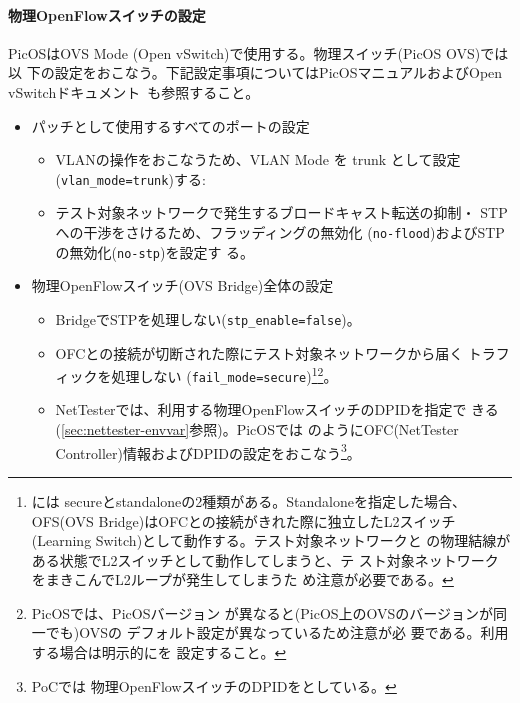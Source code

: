     \paragraph{物理OpenFlowスイッチの設定}
PicOSはOVS Mode (Open vSwitch)で使用する。物理スイッチ(PicOS OVS)では以
下の設定をおこなう。下記設定事項についてはPicOSマニュアルおよびOpen
vSwitchドキュメント~\cite{ovs-vswitchd-doc}も参照すること。
\begin{itemize}
 \item パッチとして使用するすべてのポートの設定~\cite{l1pjtech}
       \begin{itemize}
        \item VLANの操作をおこなうため、VLAN Mode を trunk として設定
              (\verb|vlan_mode=trunk|)する:
        \item テスト対象ネットワークで発生するブロードキャスト転送の抑制・
              STPへの干渉をさけるため、フラッディングの無効化
              (\verb|no-flood|)およびSTPの無効化(\verb|no-stp|)を設定す
              る。
       \end{itemize}
 \item 物理OpenFlowスイッチ(OVS Bridge)全体の設定
       \begin{itemize}
        \item BridgeでSTPを処理しない(\verb|stp_enable=false|)。
        \item OFCとの接続が切断された際にテスト対象ネットワークから届く
              トラフィックを処理しない
              (\verb|fail_mode=secure|)\footnote{には
              secureとstandaloneの2種類がある。Standaloneを指定した場合、
              OFS(OVS Bridge)はOFCとの接続がきれた際に独立したL2スイッチ
              (Learning Switch)として動作する。テスト対象ネットワークと
              の物理結線がある状態でL2スイッチとして動作してしまうと、テ
              スト対象ネットワークをまきこんでL2ループが発生してしまうた
              め注意が必要である。}\footnote{PicOSでは、PicOSバージョン
              が異なると(PicOS上のOVSのバージョンが同一でも)OVSの
              デフォルト設定が異なっているため注意が必
              要である。利用する場合は明示的にを
              設定すること。}。
        \item NetTesterでは、利用する物理OpenFlowスイッチのDPIDを指定で
              きる(\ref{sec:nettester-envvar}参照)。PicOSでは
              のようにOFC(NetTester
              Controller)情報およびDPIDの設定をおこなう\footnote{PoCでは
              物理OpenFlowスイッチのDPIDをとしている。}。

\end{itemize}
\end{itemize}

